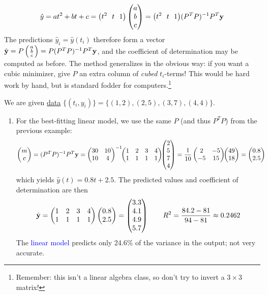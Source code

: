 \[\hat y=at^2+bt+c=\bigl(t^2\ \ t\ \ 1\bigr)\threevec abc =\bigl(t^2\ \ t\ \ 1\bigr)(P^TP)^{-1}P^T\vy\]
The predictions $\hat y_i=\hat y(t_i)$ therefore form a vector $\hat{{\mathbf{y}}}=P\left(\begin{smallmatrix}a\\b\\c\end{smallmatrix}\right)=P(P^TP)^{-1}P^T{\mathbf{y}}$, and the coefficient of determination may be computed as before.
\smallbreak
The method generalizes in the obvious way: if you want a cubic minimizer, give $P$ an extra column of \emph{cubed} $t_i$-terms! This would be hard work by hand, but is standard fodder for computers.\footnote{Remember: this isn't a linear algebra class, so don't try to invert a $3\times 3$ matrix!}

\clearpage

\begin{example}{}{}
We are given \href{http://math.uci.edu/~ndonalds/math8/poly-ex.xlsx}{data} $\{(t_i,y_i)\}=\{(1,2),(2,5),(3,7),(4,4)\}$.
\begin{enumerate}
  \item For the best-fitting linear model, we use the same $P$ (and thus $P^TP$) from the previous example:
  \begin{align*}
  \begin{pmatrix}m\\c\end{pmatrix}&=(P^TP)^{-1}P^T{\mathbf{y}}= \begin{pmatrix}
	30&10\\10&4
	\end{pmatrix}^{-1}
	\!\!
	\begin{pmatrix}
	1&2&3&4\\
	1&1&1&1
	\end{pmatrix}\!\!\begin{pmatrix}2\\5\\7\\4\end{pmatrix} =\frac 1{10}\begin{pmatrix}
	2&-5\\-5&15
	\end{pmatrix}\!\!\begin{pmatrix}49\\18\end{pmatrix} =\begin{pmatrix}0.8\\2.5\end{pmatrix}
\end{align*}
which yields $\hat y(t)=0.8t+2.5$. The predicted values and coefficient of determination are then
\[\hat{{\mathbf{y}}}=\begin{pmatrix}
	1&2&3&4\\
	1&1&1&1
\end{pmatrix}\begin{pmatrix}0.8\\2.5\end{pmatrix}=\begin{pmatrix}3.3\\4.1\\4.9\\5.7\end{pmatrix}\qquad R^2=\frac{84.2-81}{94-81}\approx 0.2462
\]
	The \textcolor{blue}{linear model} predicts only 24.6\% of the variance in the output; not very accurate.
	

\end{enumerate}
\end{example}
